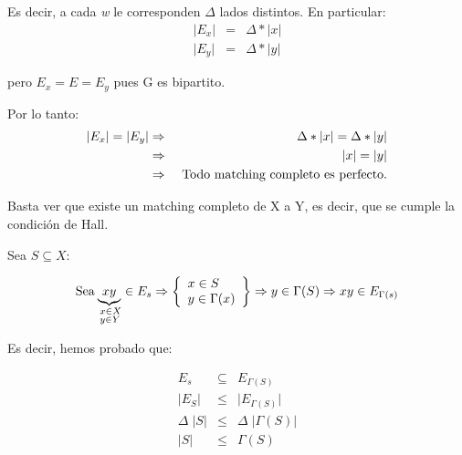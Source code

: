 \documentclass[12pt,a4paper]{report}
\begin{document}
  			\par Es decir, a cada \textit{w} le corresponden $\Delta$ lados distintos. En particular:
  			\begin{eqnarray}
  				\nonumber \lvert E_{x} \rvert &=& \Delta * \lvert x \rvert \\
  				\nonumber \lvert E_{y} \rvert &=& \Delta * \lvert y \rvert
  			\end{eqnarray}
  			\par pero $E_{x} = E = E_{y}$ pues G es bipartito.

  			\vspace{5mm}
  			\par Por lo tanto:
  			\begin{eqnarray}
  				\nonumber \lvert E_{x} \rvert = \lvert E_{y} \rvert &\Rightarrow & \Delta * \lvert x \rvert = \Delta * \lvert y \rvert \\
  				\nonumber &\Rightarrow & \lvert x \rvert = \lvert y \rvert \\
  				\nonumber &\Rightarrow & \textup{ Todo matching completo es perfecto.}
  			\end{eqnarray}

  			\vspace{3mm}
  			\par Basta ver que existe un matching completo de X a Y, es decir, que se cumple la condición de Hall.

  			\vspace{5mm}
  			\par Sea $S \subseteq X$:

  			\begin{equation*}
  				\text{Sea}
  				\underbrace{xy}_{\begin{subarray}{l} \; x \in X \\
  				\; y \in Y \end{subarray}} \in E_{s} \Rightarrow
  	  			\left\lbrace
  	  			\begin{array}{l}
  	    			x \in S \\
  	     		  	y \in \Gamma(x) \\
  	  			\end{array}
  	 			\right\rbrace
  	 			\Rightarrow y \in \Gamma(S) \Rightarrow xy \in E_{\Gamma(s)}
  			\end{equation*}

  			\vspace{3mm}
  			\par Es decir, hemos probado que:

  			\begin{eqnarray}
  				\nonumber E_{s} &\subseteq & E_{\Gamma(S)} \\
  				\nonumber \lvert E_{S} \rvert &\leq & \lvert E_{\Gamma(S)} \rvert \\
  				\nonumber \Delta \; \lvert S \rvert &\leq & \Delta \; \lvert \Gamma(S) \rvert \\
  				\nonumber \lvert S \rvert &\leq & \Gamma(S)
  			\end{eqnarray}
\end{document}
